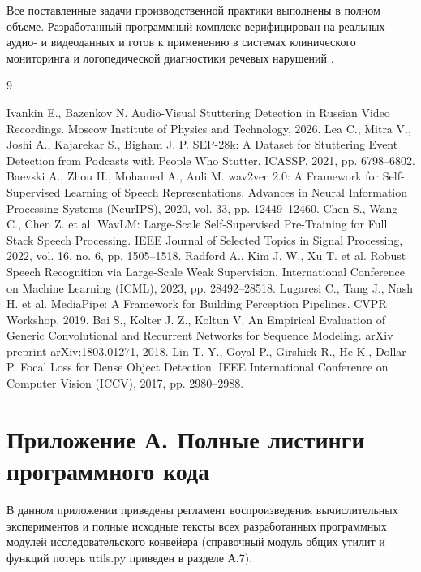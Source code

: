 \documentclass[a4paper,14pt]{extarticle}
\begin{document}
		Все поставленные задачи производственной практики выполнены в полном объеме. Разработанный программный комплекс верифицирован на реальных аудио- и видеоданных и готов к применению в системах клинического мониторинга и логопедической диагностики речевых нарушений \cite{ivankin}.
	
	\newpage
	\begin{thebibliography}{9}
		Ivankin E., Bazenkov N. Audio-Visual Stuttering Detection in Russian Video Recordings. Moscow Institute of Physics and Technology, 2026.
		Lea C., Mitra V., Joshi A., Kajarekar S., Bigham J. P. SEP-28k: A Dataset for Stuttering Event Detection from Podcasts with People Who Stutter. ICASSP, 2021, pp. 6798--6802.
		Baevski A., Zhou H., Mohamed A., Auli M. wav2vec 2.0: A Framework for Self-Supervised Learning of Speech Representations. Advances in Neural Information Processing Systems (NeurIPS), 2020, vol. 33, pp. 12449--12460.
		Chen S., Wang C., Chen Z. et al. WavLM: Large-Scale Self-Supervised Pre-Training for Full Stack Speech Processing. IEEE Journal of Selected Topics in Signal Processing, 2022, vol. 16, no. 6, pp. 1505--1518.
		Radford A., Kim J. W., Xu T. et al. Robust Speech Recognition via Large-Scale Weak Supervision. International Conference on Machine Learning (ICML), 2023, pp. 28492--28518.
		Lugaresi C., Tang J., Nash H. et al. MediaPipe: A Framework for Building Perception Pipelines. CVPR Workshop, 2019.
		Bai S., Kolter J. Z., Koltun V. An Empirical Evaluation of Generic Convolutional and Recurrent Networks for Sequence Modeling. arXiv preprint arXiv:1803.01271, 2018.
		Lin T. Y., Goyal P., Girshick R., He K., Dollar P. Focal Loss for Dense Object Detection. IEEE International Conference on Computer Vision (ICCV), 2017, pp. 2980--2988.
	\end{thebibliography}
	
	\newpage
	\section*{Приложение А. Полные листинги программного кода}
	
	В данном приложении приведены регламент воспроизведения вычислительных экспериментов и полные исходные тексты всех разработанных программных модулей исследовательского конвейера (справочный модуль общих утилит и функций потерь utils.py приведен в разделе А.7).
	
\end{document}
